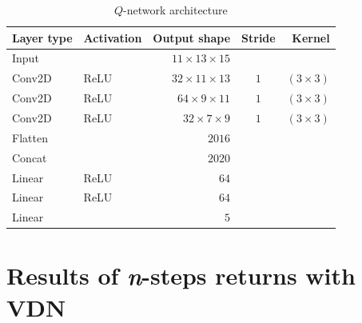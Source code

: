 \begin{table}[h]
    \centering
    \caption{$Q$-network architecture}
    \label{tab:nn}
    \begin{tabular}{|llrcr|}
        \hline
         \textbf{Layer type} & \textbf{Activation} & \textbf{Output shape} & \textbf{Stride} & \textbf{Kernel} \\
         \hline
         Input & & $11 \times 13 \times 15$ & &\\
         Conv2D & ReLU & $32 \times 11 \times 13$ & $1$ & $(3 \times 3)$\\
         Conv2D & ReLU & $64 \times 9 \times 11$ & $1$ & $(3 \times 3)$\\
         Conv2D & ReLU & $32 \times 7 \times 9$ & $1$ &  $(3 \times 3)$\\
         Flatten & & $2016$ &&\\
         Concat & & $2020$&&\\
         Linear & ReLU & $64$ &&\\
         Linear & ReLU & $64$ &&\\
         Linear & & $5$ &&\\
         \hline
    \end{tabular}
\end{table}

\section{Results of \textit{n}-steps returns with VDN}
\label{apx:n-step}

